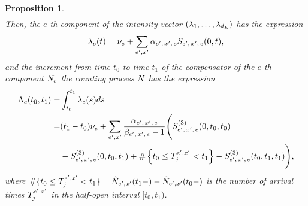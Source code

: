 \documentclass[10pt]{article}
\newtheorem{prop}[thm]{Proposition}
\begin{document}
\begin{prop}
\begin{equation}
\begin{split}
  \end{split}
 \end{equation}
 Then, the $e$-th component of the intensity vector $(\intensity[1],\dots,\intensity[\numEventTypes])$ has the expression
 \begin{equation}\label{eq.intensity_powerlaw}
  \intensity[e](t) = \baseRate_e +\sum_{\eone,\xone}\impCoef\subscriptexe\ESSE\subscriptexe(0,t),
 \end{equation}
and the increment from time $t_0$ to time $t_1$ of the compensator of the $e$-th component $\countingProc$ the counting process $\multiCountingProc$ has the expression
\begin{equation}
\begin{split}
 \compensator_e(t_0,t_1)=&\int_{t_0}^{t_1} \intensity[e](s)ds
 \\
 =&
 (t_1 - t_0)\baseRate_e
 + \sum_{\eone,\xone} \frac{\impCoef\subscriptexe}{\decCoef\subscriptexe - 1}
 \Bigg(
 \ESSEthree\subscriptexe(0,t_0,t_0) 
 \\
 & - \ESSEthree\subscriptexe(0,t_0,t_1)
 +\# \left\lbrace t_0 \leq \arrivalTimes[\eone,\xone]_j <t_1\right\rbrace
 - \ESSEthree\subscriptexe(t_0,t_1,t_1)
 \Bigg),
\end{split} 
\end{equation}
where $\# \lbrace t_0 \leq \arrivalTimes[\eone,\xone]_j <t_1\rbrace = \hybridHawkes_{\eone,\xone}(t_1 -)-\hybridHawkes_{\eone,\xone}(t_0-)$ is the number of arrival times $\arrivalTimes[\eone,\xone]_j$ in the half-open interval $[t_0,t_1)$. 
\end{prop}
\end{document}
